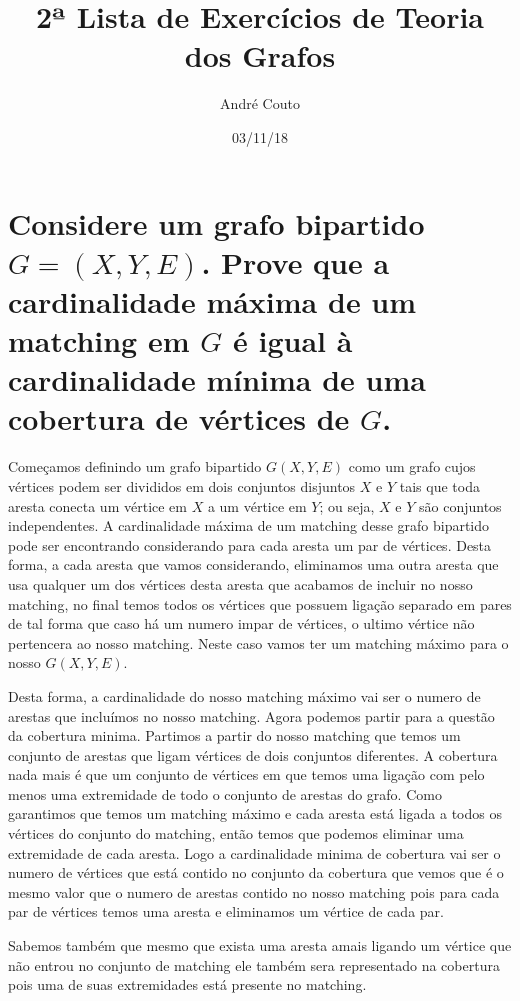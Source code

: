 \documentclass[a4paper,12pt]{article}
\title{2ª Lista de Exercícios de Teoria dos Grafos}
\author{André Couto}
\date{03/11/18}
\begin{document}
\maketitle

\section{Considere um grafo bipartido $G = (X, Y, E)$. Prove que a cardinalidade máxima de um matching em $G$ é igual à cardinalidade mínima de uma cobertura de vértices de $G$.}

	Começamos definindo um grafo bipartido $G(X, Y, E)$ como um grafo cujos vértices podem ser divididos em dois conjuntos disjuntos $X$ e $Y$ tais que toda aresta conecta um vértice em $X$ a um vértice em $Y$; ou seja, $X$ e $Y$ são conjuntos independentes. A cardinalidade máxima de um matching desse grafo bipartido pode ser encontrando considerando para cada aresta um par de vértices. Desta forma, a cada aresta que vamos considerando, eliminamos uma outra aresta que usa qualquer um dos vértices desta aresta que acabamos de incluir no nosso matching, no final temos todos os vértices que possuem ligação separado em pares de tal forma que caso há um numero impar de vértices, o ultimo vértice não pertencera ao nosso matching. Neste caso vamos ter um matching máximo para o nosso $G(X, Y, E)$.
	
	Desta forma, a cardinalidade do nosso matching máximo vai ser o numero de arestas que incluímos no nosso matching. Agora podemos partir para a questão da cobertura minima. Partimos a partir do nosso matching que temos um conjunto de arestas que ligam vértices de dois conjuntos diferentes. A cobertura nada mais é que um conjunto de vértices em que temos uma ligação com pelo menos uma extremidade de todo o conjunto de arestas do grafo. Como garantimos que temos um matching máximo e cada aresta está ligada a todos os vértices do conjunto do matching, então temos que podemos eliminar uma extremidade de cada aresta. Logo a cardinalidade minima de cobertura vai ser o numero de vértices que está contido no conjunto da cobertura que vemos que é o mesmo valor que o numero de arestas contido no nosso matching pois para cada par de vértices temos uma aresta e eliminamos um vértice de cada par.
	
	Sabemos também que mesmo que exista uma aresta amais ligando um vértice que não entrou no conjunto de matching ele também sera representado na cobertura pois uma de suas extremidades está presente no matching.
\end{document}
